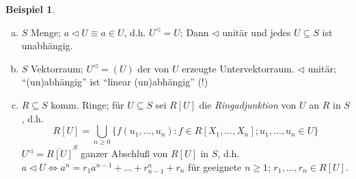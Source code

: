 \documentclass[headsepline=true,DIV=11]{scrartcl}
\theoremstyle{definition}
\newtheorem*{example}{Beispiel}
\renewcommand{\bar}[1]{\overline{#1}}
\begin{document}
\begin{example}
	\begin{enumerate}[(a)]
		\item $S$ Menge; $a\lhd U \equiv a\in U$, d.h. $U^\lhd=U$; Dann $\lhd$ unitär und jedes $U\subseteq S$ ist unabhängig.
		\item $S$ Vektorraum; $U^\lhd=(U)$ der von $U$ erzeugte Untervektorraum. $\lhd$ unitär; ``(un)abhängig'' ist ``linear (un)abhängig'' (!)
		\item $R\subseteq S$ komm. Ringe; für $U\subseteq S$ sei $R[U]$ die {\em Ringadjunktion} von $U$ an $R$ in $S$, d.h.
			\[ R[U]= \bigcup_{n\ge 0} \{ f(u_1,\ldots,u_n)\colon f\in R[X_1,\ldots,X_n]; u_1,\ldots, u_n \in U\} \]
			$U^\lhd = \bar{ R[U] }^S$ ganzer Abschluß von $R[U]$ in $S$, d.h. $a\lhd U\iff a^n = r_1a^{n-1}+\ldots+r_{n-1}^a + r_n$ für geeignete $n\ge 1$; $r_1,\ldots,r_n\in R[U]$.
	\end{enumerate}
\end{example}
\end{document}
